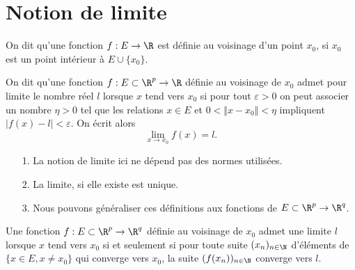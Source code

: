 \documentclass[class=report,crop=false]{standalone}
\begin{document}
\section{Notion de limite }
\begin{definition}
\textcolor[rgb]{0.73,0.00,0.00}{
\noindent On dit qu'une fonction $f:E \rightarrow \R$ est définie au voisinage d'un point
$x_0$, si $x_0$ est un point intérieur à $E \cup \lbrace x_0 \rbrace$.
}
\end{definition}


\begin{definition}
\textcolor[rgb]{0.73,0.00,0.00}{
\noindent On dit qu'une fonction $f: E\subset \R^p \rightarrow \R$ définie au voisinage de $x_0$ admet 
pour limite le nombre réel $l$ lorsque $x$ tend vers $x_0$ si pour tout $\varepsilon >0$ 
on peut associer un nombre $\eta>0$ tel que les relations $x\in E$ et $0< \Vert x-x_0 \Vert <\eta$
impliquent $\vert f(x)-l \vert < \varepsilon$. On écrit alors 
\begin{equation*}
\displaystyle \lim_{x\rightarrow x_0} f(x)=l.
\end{equation*}
}
\end{definition}




\begin{remarque*}
\textcolor[rgb]{0.00,0.00,1.00}{
\noindent 
\begin{itemize}
\item[1.] La notion de limite ici ne dépend pas des normes utilisées.
\item[2.] La limite, si elle existe est unique.
\item[3.] Nous pouvons généraliser ces définitions aux fonctions de $E \subset \R^p \rightarrow \R^q$.
\end{itemize}
}
\end{remarque*}



 
 \begin{proposition}
\textcolor[rgb]{0.50,0.00,0.25}{
Une fonction $f: E\subset \R^p \rightarrow \R^q$ définie au voisinage de $x_0$ admet une limite $l$ 
lorsque $x$ tend vers $x_0$ si et seulement si pour toute suite $(x_n)_{n\in \N}$
d'éléments de $\lbrace x \in E, x \neq x_0 \rbrace$ qui converge vers $x_0$, la suite
$(f(x_n))_{n\in \N}$ converge vers $l$.
}
\end{proposition}
\end{document}
